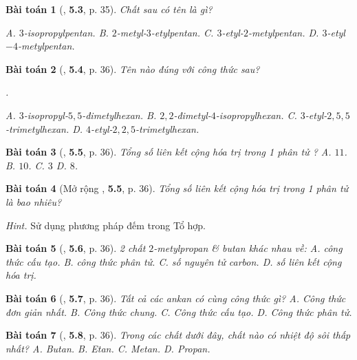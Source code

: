 \documentclass{article}
\numberwithin{equation}{section}
\newtheorem{baitoan}{Bài toán}[section]
\begin{document}
\begin{baitoan}[\cite{SBT_Hoa_Hoc_11_co_ban}, \textbf{5.3}, p. 35]
	Chất sau có tên là gì?
	\begin{center}
	\end{center}
	{\sf A.} $3$-isopropylpentan. {\sf B.} $2$-metyl-$3$-etylpentan. {\sf C.} $3$-etyl-$2$-metylpentan. {\sf D.} $3$-etyl$-4$-metylpentan.
\end{baitoan}

\begin{baitoan}[\cite{SBT_Hoa_Hoc_11_co_ban}, \textbf{5.4}, p. 36]
	Tên nào đúng với công thức sau?
	\begin{center}
		.
	\end{center}
	{\sf A.} $3$-isopropyl-$5,5$-đimetylhexan. {\sf B.} $2,2$-đimetyl-$4$-isopropylhexan. {\sf C.} $3$-etyl-$2,5,5$-trimetylhexan. {\sf D.} $4$-etyl-$2,2,5$-trimetylhexan.
\end{baitoan}

\begin{baitoan}[\cite{SBT_Hoa_Hoc_11_co_ban}, \textbf{5.5}, p. 36]
	Tổng số liên kết cộng hóa trị trong 1 phân tử \emph{}? {\sf A.} $11$. {\sf B.} $10$. {\sf C.} $3$ {\sf D.} $8$.
\end{baitoan}

\begin{baitoan}[Mở rộng \cite{SBT_Hoa_Hoc_11_co_ban}, \textbf{5.5}, p. 36]
	Tổng số liên kết cộng hóa trị trong 1 phân tử \emph{} là bao nhiêu?
\end{baitoan}
\noindent\textit{Hint.} Sử dụng phương pháp đếm trong Tổ hợp.

\begin{baitoan}[\cite{SBT_Hoa_Hoc_11_co_ban}, \textbf{5.6}, p. 36]
	2 chất $2$-metylpropan \& butan khác nhau về: {\sf A.} công thức cấu tạo. {\sf B.} công thức phân tử. {\sf C.} số nguyên tử carbon. {\sf D.} số liên kết cộng hóa trị.
\end{baitoan}

\begin{baitoan}[\cite{SBT_Hoa_Hoc_11_co_ban}, \textbf{5.7}, p. 36]
	Tất cả các ankan có cùng công thức gì? {\sf A.} Công thức đơn giản nhất. {\sf B.} Công thức chung. {\sf C.} Công thức cấu tạo. {\sf D.} Công thức phân tử.
\end{baitoan}

\begin{baitoan}[\cite{SBT_Hoa_Hoc_11_co_ban}, \textbf{5.8}, p. 36]
	Trong các chất dưới đây, chất nào có nhiệt độ sôi thấp nhất? {\sf A.} Butan. {\sf B.} Etan. {\sf C.} Metan. {\sf D.} Propan.
\end{baitoan}
\end{document}
